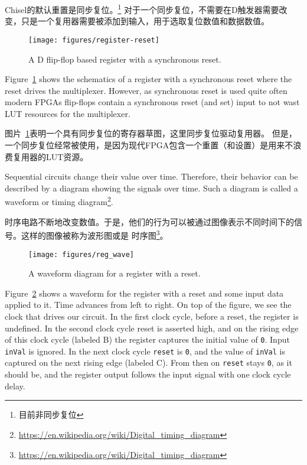 \documentclass[%
    10pt,
    headinclude, footexclude,
    openright, %
    notitlepage,
    cleardoubleempty,
    headsepline,
    pointlessnumbers,
    bibtotoc, idxtotoc,
    ]{scrbook}
\newcommand{\code}[1]{{\small{\texttt{#1}}}}
\newcommand{\scale}{0.7}
\newcommand{\todo}[1]{{\emph{TODO: #1}}}
\newcommand{\myref}[2]{\href{#1}{#2}}
\renewcommand{\myref}[2]{{#2}{\footnote{\url{#1}}}}
\renewcommand{\todo}[1]{}
\begin{document}
Chisel的默认重置是同步复位。\footnote{目前非同步复位}
对于一个同步复位，不需要在D触发器需要改变，只是一个复用器需要被添加到输入，用于选取复位数值和数据数值。


\begin{figure}
  \centering
  \texttt{[image: figures/register-reset]}
  \caption{A D flip-flop based register with a synchronous reset.}
  \label{fig:register-reset}
\end{figure}

Figure~\ref{fig:register-reset} shows the schematics of a register with a synchronous reset
where the reset drives the multiplexer. However, as synchronous reset is used quite often
modern FPGAs flip-flops contain a synchronous reset (and set) input to not wast LUT
resources for the multiplexer.

图片~\ref{fig:register-reset}表明一个具有同步复位的寄存器草图，这里同步复位驱动复用器。
但是，一个同步复位经常被使用，是因为现代FPGA包含一个重置（和设置）是用来不浪费复用器的LUT资源。

Sequential circuits change their value over time. Therefore, their behavior can be described
by a diagram showing the signals over time. Such a diagram is called a waveform or
\myref{https://en.wikipedia.org/wiki/Digital_timing_diagram}{timing diagram}.

时序电路不断地改变数值。于是，他们的行为可以被通过图像表示不同时间下的信号。这样的图像被称为波形图或是
\myref{https://en.wikipedia.org/wiki/Digital_timing_diagram}{时序图}。

\todo{from Luca: Do readers know about timing diagrams?}

\begin{figure}
  \centering
  \texttt{[image: figures/reg\_wave]}
  \caption{A waveform diagram for a register with a reset.}
  \label{fig:register-wave}
\end{figure}

Figure~\ref{fig:register-wave} shows a waveform for the register with a reset
and some input data applied to it.
Time advances from left to right. On top of the figure, we see the clock that drives our circuit.
In the first clock cycle, before a reset, the register is undefined. In the second clock cycle reset
is asserted high, and on the rising edge of this clock cycle (labeled B) the register
captures the initial value of \code{0}. Input \code{inVal} is ignored. In the next clock cycle
\code{reset} is \code{0}, and the value of \code{inVal} is captured on the next rising
edge (labeled C). From then on \code{reset} stays \code{0}, as it should be, and the
register output follows the input signal with one clock cycle delay.
\end{document}
